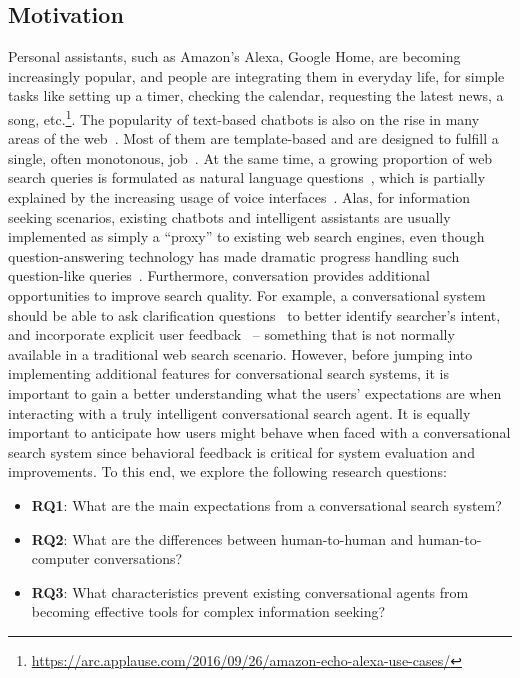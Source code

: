 \subsection{Motivation}
\label{section:conversation:user-study:motivation}

Personal assistants, such as Amazon's Alexa, Google Home, \etc are becoming increasingly popular, and people are integrating them in everyday life, \eg for simple tasks like setting up a timer, checking the calendar, requesting the latest news, a song, etc.\footnote{\href{url}{https://arc.applause.com/2016/09/26/amazon-echo-alexa-use-cases/}}.
The popularity of text-based chatbots is also on the rise in many areas of the web~\cite{ferrara2014rise}.
Most of them are template-based and are designed to fulfill a single, often monotonous, job~\cite{clement2015interacting,edwards2014bot}.
At the same time, a growing proportion of web search queries is formulated as natural language questions~\cite{aula2010does,liu2012web,pang2011search}, which is partially explained by the increasing usage of voice interfaces~\cite{white2015questions}.
Alas, for information seeking scenarios, existing chatbots and intelligent assistants are usually implemented as simply a ``proxy'' to existing web search engines, even though question-answering technology has made dramatic progress handling such question-like queries~\cite{tsai2015web}.
Furthermore, conversation provides additional opportunities to improve search quality. For example, a conversational system should be able to ask clarification questions~\cite{braslavski2017clarq} to better identify searcher's intent, and incorporate explicit user feedback~\cite{radlinski2017} -- something that is not normally available in a traditional web search scenario.
However, before jumping into implementing additional features for conversational search systems, it is important to gain a better understanding what the users' expectations are when interacting with a truly intelligent conversational search agent. It is equally important to anticipate how users might behave when faced with a conversational search system since behavioral feedback is critical for system evaluation and improvements. To this end, we explore the following research questions:

\begin{itemize}
\item \textbf{RQ1}: What are the main expectations from a conversational search system?
\item \textbf{RQ2}: What are the differences between human-to-human and human-to-computer conversations?
\item \textbf{RQ3}: What characteristics prevent existing conversational agents from becoming effective tools for complex information seeking?
\end{itemize}

